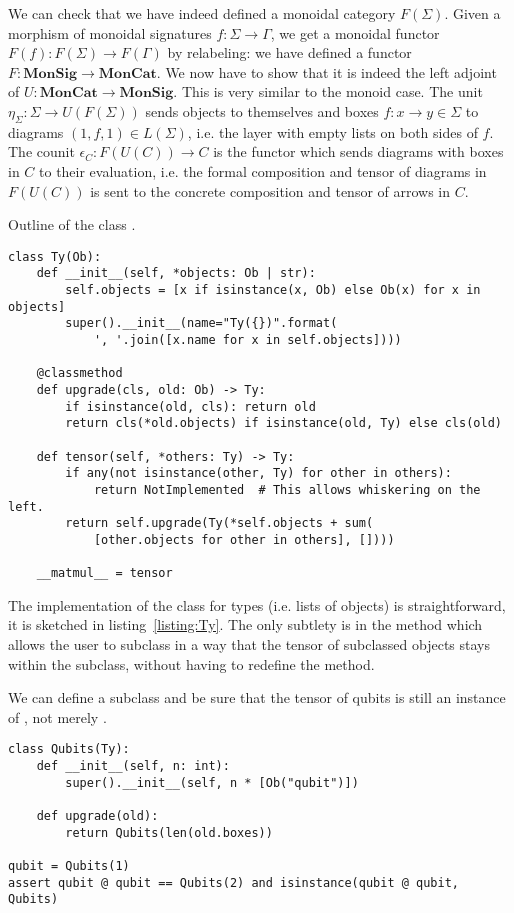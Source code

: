 We can check that we have indeed defined a monoidal category $F(\Sigma)$.
Given a morphism of monoidal signatures $f : \Sigma \to \Gamma$, we get a monoidal functor $F(f) : F(\Sigma) \to F(\Gamma)$ by relabeling: we have defined a functor $F : \mathbf{MonSig} \to \mathbf{MonCat}$.
We now have to show that it is indeed the left adjoint of $U : \mathbf{MonCat} \to \mathbf{MonSig}$.
This is very similar to the monoid case.
The unit $\eta_\Sigma : \Sigma \to U(F(\Sigma))$ sends objects to themselves and boxes $f : x \to y \in \Sigma$ to diagrams $(1, f, 1) \in L(\Sigma)$, i.e. the layer with empty lists on both sides of $f$.
The counit $\epsilon_C : F(U(C)) \to C$ is the functor which sends diagrams with boxes in $C$ to their evaluation, i.e. the formal composition and tensor of diagrams in $F(U(C))$ is sent to the concrete composition and tensor of arrows in $C$.

\begin{python}\label{listing:Ty}
{\normalfont Outline of the class .}
\begin{verbatim}
class Ty(Ob):
    def __init__(self, *objects: Ob | str):
        self.objects = [x if isinstance(x, Ob) else Ob(x) for x in objects]
        super().__init__(name="Ty({})".format(
            ', '.join([x.name for x in self.objects])))

    @classmethod
    def upgrade(cls, old: Ob) -> Ty:
        if isinstance(old, cls): return old
        return cls(*old.objects) if isinstance(old, Ty) else cls(old)

    def tensor(self, *others: Ty) -> Ty:
        if any(not isinstance(other, Ty) for other in others):
            return NotImplemented  # This allows whiskering on the left.
        return self.upgrade(Ty(*self.objects + sum(
            [other.objects for other in others], [])))

    __matmul__ = tensor
\end{verbatim}
\end{python}

The implementation of the class  for types (i.e. lists of objects) is straightforward, it is sketched in listing~\ref{listing:Ty}.
The only subtlety is in the method  which allows the user to subclass  in a way that the tensor of subclassed objects stays within the subclass, without having to redefine the  method.

\begin{example}
We can define a  subclass and be sure that the tensor of qubits is still an instance of , not merely .
\begin{verbatim}
class Qubits(Ty):
    def __init__(self, n: int):
        super().__init__(self, n * [Ob("qubit")])

    def upgrade(old):
        return Qubits(len(old.boxes))

qubit = Qubits(1)
assert qubit @ qubit == Qubits(2) and isinstance(qubit @ qubit, Qubits)
\end{verbatim}
\end{example}

